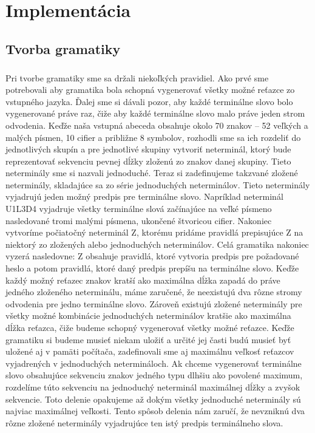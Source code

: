 \chapter{Implementácia}

\section{Tvorba gramatiky}
\paragraph{}
Pri tvorbe gramatiky sme sa držali niekoľkých pravidiel. Ako prvé sme potrebovali aby gramatika bola schopná vygenerovať všetky možné reťazce zo vstupného jazyka. Ďalej sme si dávali pozor, aby každé terminálne slovo bolo vygenerované práve raz, čiže aby každé terminálne slovo malo práve jeden strom odvodenia. Keďže naša vstupná abeceda obsahuje okolo 70 znakov – 52 veľkých a malých písmen, 10 cifier a približne 8 symbolov, rozhodli sme sa ich rozdeliť do jednotlivých skupín a pre jednotlivé skupiny vytvoriť neterminál, ktorý bude reprezentovať sekvenciu pevnej dĺžky zloženú zo znakov danej skupiny. Tieto neterminály sme si nazvali jednoduché. Teraz si zadefinujeme takzvané zložené neterminály, skladajúce sa zo série jednoduchých neterminálov. Tieto neterminály vyjadrujú jeden možný predpis pre terminálne slovo. Napríklad neterminál U1L3D4 vyjadruje všetky terminálne slová začínajúce na veľké písmeno nasledované tromi malými písmena, ukončené štvoricou cifier. Nakoniec vytvoríme počiatočný neterminál Z, ktorému pridáme pravidlá prepisujúce Z na niektorý zo zložených alebo jednoduchých neterminálov. Celá gramatika nakoniec vyzerá nasledovne: Z obsahuje pravidlá, ktoré vytvoria predpis pre požadované heslo a potom pravidlá, ktoré daný predpis prepíšu na terminálne slovo. Keďže každý možný reťazec znakov kratší ako maximálna dĺžka zapadá do práve jedného zloženého neterminálu, máme zaručené, že neexistujú dva rôzne stromy odvodenia pre jedno terminálne slovo. Zároveň existujú zložené neterminály pre všetky možné kombinácie jednoduchých neterminálov kratšie ako maximálna dĺžka reťazca, čiže budeme schopný vygenerovať všetky možné reťazce. Keďže gramatiku si budeme musieť niekam uložiť a určité jej časti budú musieť byť uložené aj v pamäti počítača, zadefinovali sme aj maximálnu veľkosť reťazcov vyjadrených v jednoduchých netermináloch. Ak chceme vygenerovať terminálne slovo obsahujúce sekvenciu znakov jedného typu dlhšiu ako povolené maximum, rozdelíme túto sekvenciu na jednoduchý neterminál maximálnej dĺžky a zvyšok sekvencie. Toto delenie opakujeme až dokým všetky jednoduché neterminály sú najviac maximálnej veľkosti. Tento spôsob delenia nám zaručí, že nevzniknú dva rôzne zložené neterminály vyjadrujúce ten istý predpis terminálneho slova.

